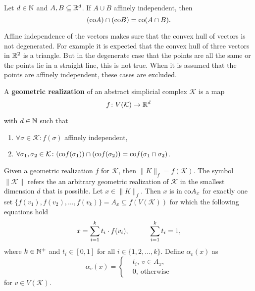 \begin{rem}
  Let $d\in\mathbb{N}$ and $A,B \subseteq \mathbb{R}^d$. If $A \cup B$ affinely independent, then
  \begin{equation*}
    ({\rm co} A) \cap ({\rm co}B) = {\rm co}(A \cap B).
  \end{equation*}
\end{rem}

Affine independence of the vectors makes sure that the convex hull of vectors is not degenerated.
For example it is expected that the convex hull of three vectors in $\mathbb{R}^2$ is a triangle. But in the degenerate case that the points are all the same
or the points lie in a straight line, this is not true. When it is assumed that the points are affinely independent, these cases are excluded. 

\begin{defin}
  A \textbf{geometric realization} of an abstract simplicial complex $\mathcal{K}$ is a map
  \begin{equation*}
    f\colon V(\mathcal{K}) \to \mathbb{R}^d
  \end{equation*}

  with $d \in \mathbb{N}$ such that
  \begin{enumerate}
    \item $\forall \sigma \in \mathcal{K}\colon f(\sigma)$ affinely independent,
    \item $\forall \sigma_1, \sigma_2\in \mathcal{K}\colon ({\rm co}f(\sigma_1)) \cap ({\rm co} f(\sigma_2)) = {\rm co}f(\sigma_1 \cap \sigma_2)$.
  \end{enumerate}
    Given a geometric realization $f$ for $\mathcal{K}$, then $\lVert K \rVert_f = f(\mathcal{K})$. The symbol $\lVert \mathcal{K} \rVert$ refers the an arbitrary geometric realization of $\mathcal{K}$ in the smallest dimension $d$ that is possible.
    Let $x \in \lVert K \rVert_f$. Then $x$ is in ${\rm co}A_x$ for exactly one set $\{f(v_1), f(v_2), \ldots, f(v_k)\} = A_x \subseteq f(V(\mathcal{K}))$ for which the following equations hold 
    \begin{equation*}
      x = \sum\limits_{i=1}^k t_i \cdot f(v_i), \hspace*{30px} \sum\limits_{i=1}^k t_i = 1, 
    \end{equation*}
    where $k\in \mathbb{N}^+$ and $t_i \in [0, 1]$ for all $i \in \{1, 2, \ldots, k\}$. Define $\alpha_v(x)$ as
    \begin{equation*}
      \alpha_v(x) = \begin{cases}
        &t_i, \: v \in A_x, \\
        &0, \: \text{otherwise}
      \end{cases}
    \end{equation*}
    for $v \in V(\mathcal{K})$.
\end{defin} 

